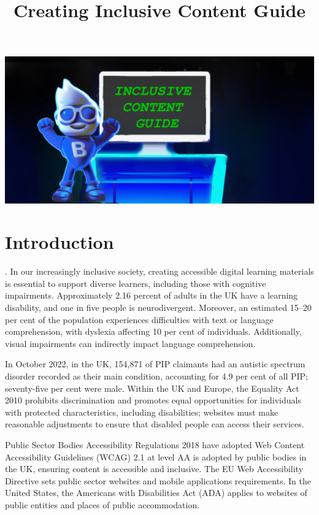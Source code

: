\documentclass[main.tex]{subfiles}
\title{Creating Inclusive Content Guide}
\begin{document}
\begin{titlepage}

        \vskip2cm
  \includegraphics[width=14cm]{images/management/Bingster_inclusive_img.png} %
    \vfill
    \vfill
\end{titlepage}




\tableofcontents

\newpage{}


\section{Introduction}
. 
In our increasingly inclusive society, creating accessible digital learning materials is essential to support diverse learners, including those with cognitive impairments. Approximately 2.16 percent of adults in the UK have a learning disability, and one in five people is neurodivergent. Moreover, an estimated 15–20 per cent of the population experiences difficulties with text or language comprehension, with dyslexia affecting 10 per cent of individuals. Additionally, visual impairments can indirectly impact language comprehension.

In October 2022, in the UK,  154,871 of PIP claimants had an autistic spectrum disorder recorded as their main condition, accounting for 4.9 per cent of all PIP; seventy-five per cent were male. Within the UK and Europe, the Equality Act 2010 prohibits discrimination and promotes equal opportunities for individuals with protected characteristics, including disabilities; websites must make reasonable adjustments to ensure that disabled people can access their services. 

Public Sector Bodies Accessibility Regulations 2018 have adopted Web Content Accessibility Guidelines (WCAG) 2.1 at level AA is adopted by public bodies in the UK, ensuring content is accessible and inclusive. The EU Web Accessibility Directive sets public sector websites and mobile applications requirements. In the United States, the Americans with Disabilities Act (ADA) applies to websites of public entities and places of public accommodation. 
\end{document}
